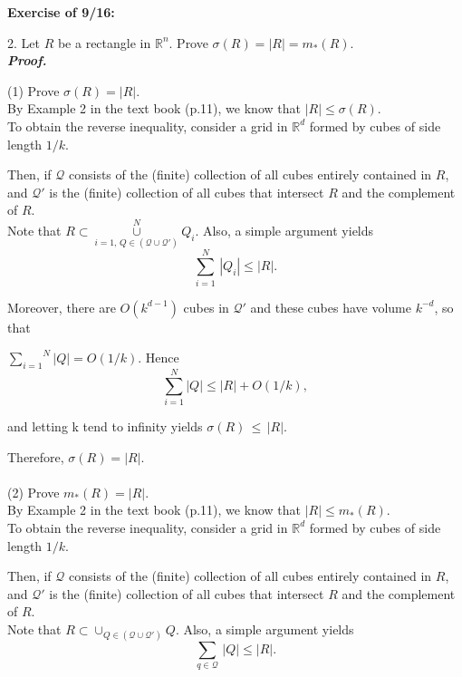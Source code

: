 \documentclass[a4paper,11pt]{article}
\begin{document}
\textbf{Exercise of 9/16:}

2. Let $R$ be a rectangle in $\mathbb{R}^n$. Prove $\sigma(R) = |R| = m_*(R)$.\\

\textbf{\textit{Proof.}}

(1) Prove $\sigma(R) = |R|$.\\

By Example 2 in the text book (p.11), we know that $|R| \leq \sigma(R)$.\\

To obtain the reverse inequality, consider a grid in $\mathbb{R}^d$ formed by cubes of side length $1/k$.

Then, if $\mathcal{Q}$ consists of the (finite) collection of all cubes entirely contained in $R$, and $\mathcal{Q}'$ is the (finite) collection of all cubes that intersect $R$ and the complement of $R$.\\

Note that $R \subset \overset{N}{\underset{i=1,\,Q \in (\mathcal{Q} \cup \mathcal{Q}')}{\cup}} Q_i$. Also, a simple argument yields
	$$\overset{N}{\underset{i=1}{\sum}}\,|Q_i| \leq |R|.$$

Moreover, there are $O(k^{d-1})$ cubes in $\mathcal{Q}'$  and these cubes have volume $k^{-d}$, so that

$\overset{N}{\underset{i=1}{\sum}}|Q| = O(1/k)$. Hence
	$$\overset{N}{\underset{i=1}{\sum}} |Q|
	\leq |R| + O(1/k),$$

and letting k tend to infinity yields $\sigma(R)\,\leq\,|R|$.

Therefore, $\sigma(R) = |R|$.\\\\


(2) Prove $m_*(R) = |R|$.\\

By Example 2 in the text book (p.11), we know that $|R| \leq m_*(R)$.\\

To obtain the reverse inequality, consider a grid in $\mathbb{R}^d$ formed by cubes of side length $1/k$.

Then, if $\mathcal{Q}$ consists of the (finite) collection of all cubes entirely contained in $R$, and $\mathcal{Q}'$ is the (finite) collection of all cubes that intersect $R$ and the complement of $R$.\\

Note that $R \subset \cup_{Q \in (\mathcal{Q} \cup \mathcal{Q}')} Q$. Also, a simple argument yields
	$$\underset{q \in \mathcal{Q}}{\sum}\,|Q| \leq |R|.$$
\end{document}
